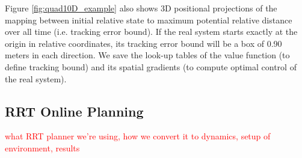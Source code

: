 Figure \ref{fig:quad10D_example} also shows 3D positional projections of the mapping between initial relative state to maximum potential relative distance over all time (i.e. tracking error bound). If the real system starts exactly at the origin in relative coordinates, its tracking error bound will be a box of 0.90 meters in each direction. We save the look-up tables of the value function (to define tracking bound) and its spatial gradients (to compute optimal control of the real system).

\subsection{RRT Online Planning}
\textcolor{red}{what RRT planner we're using, how we convert it to dynamics, setup of environment, results}
